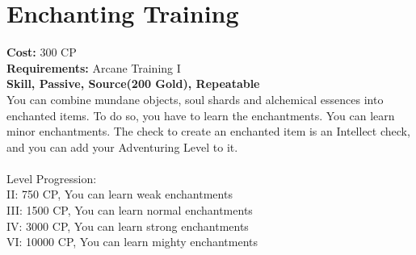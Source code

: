 \section{Enchanting Training}
\textbf{Cost:} 300 CP\\
\textbf{Requirements:} Arcane Training I\\
\textbf{Skill, Passive, Source(200 Gold), Repeatable}\\
You can combine mundane objects, soul shards and alchemical essences into enchanted items. To do so, you have to learn the enchantments. You can learn minor enchantments. The check to create an enchanted item is an Intellect check, and you can add your Adventuring Level to it.\\
\\
Level Progression:\\
II: 750 CP, You can learn weak enchantments\\
III: 1500 CP, You can learn normal enchantments\\
IV: 3000 CP, You can learn strong enchantments\\
VI: 10000 CP, You can learn mighty enchantments\\